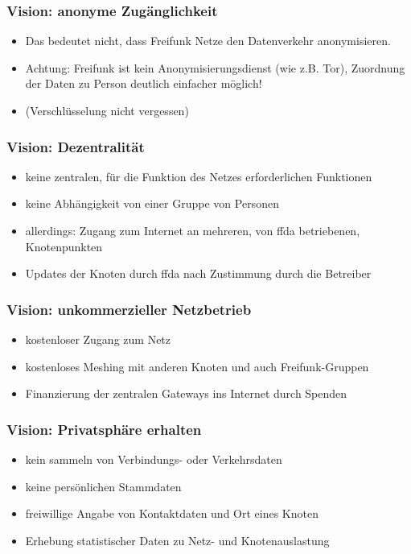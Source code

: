 \documentclass[handout]{beamer}
\begin{document}
\begin{frame}
	\frametitle{Vision: anonyme Zugänglichkeit}
	
	\begin{itemize}[<+->]
		\item Das bedeutet nicht, dass Freifunk Netze den Datenverkehr anonymisieren.
		\item Achtung: Freifunk ist kein Anonymisierungsdienst (wie z.B. Tor), Zuordnung der Daten zu Person deutlich einfacher möglich!
		\item (Verschlüsselung nicht vergessen)
	\end{itemize}
\end{frame}

\begin{frame}
	\frametitle{Vision: Dezentralität}
	
	\begin{itemize}[<+->]
		\item keine zentralen, für die Funktion des Netzes erforderlichen Funktionen
		\item keine Abhängigkeit von einer Gruppe von Personen
		\item allerdings: Zugang zum Internet an mehreren, von ffda betriebenen, Knotenpunkten
		\item Updates der Knoten durch ffda nach Zustimmung durch die Betreiber
	\end{itemize}
\end{frame}

\begin{frame}
	\frametitle{Vision: unkommerzieller Netzbetrieb}
	
	\begin{itemize}[<+->]
		\item kostenloser Zugang zum Netz
		\item kostenloses Meshing mit anderen Knoten und auch Freifunk-Gruppen
		\item Finanzierung der zentralen Gateways ins Internet durch Spenden
	\end{itemize}
\end{frame}

\begin{frame}
	\frametitle{Vision: Privatsphäre erhalten}
	
	\begin{itemize}[<+->]
		\item kein sammeln von Verbindungs- oder Verkehrsdaten
		\item keine persönlichen Stammdaten
		\item freiwillige Angabe von Kontaktdaten und Ort eines Knoten
		\item Erhebung statistischer Daten zu Netz- und Knotenauslastung
	\end{itemize}
\end{frame}
\end{document}
